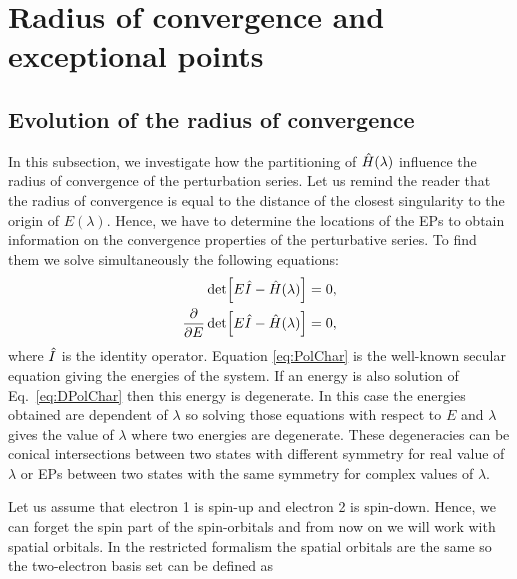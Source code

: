 \documentclass[11pt,a4paper]{article}
\newcommand{\hH}{\Hat{H}}
\newcommand{\hI}{\Hat{I}}
\begin{document}
\section{Radius of convergence and exceptional points}

\subsection{Evolution of the radius of convergence}

In this subsection, we investigate how the partitioning of $\hH(\lambda)$ influence the radius of convergence of the perturbation series. Let us remind the reader that the radius of convergence is equal to the distance of the closest singularity to the origin of $E(\lambda)$. Hence, we have to determine the locations of the EPs to obtain information on the convergence properties of the perturbative series. To find them we solve simultaneously the following equations:
\begin{subequations}
\begin{align}
	\label{eq:PolChar}
	\det[E\hI-\hH(\lambda)] & = 0,
	\\ 
	\label{eq:DPolChar}
	\pdv{E}\det[E\hI-\hH(\lambda)] & = 0,
\end{align}
\end{subequations}
where $\hI$ is the identity operator.
Equation \eqref{eq:PolChar} is the well-known secular equation giving the energies of the system. If an energy is also solution of Eq.~\eqref{eq:DPolChar} then this energy is degenerate. In this case the energies obtained are dependent of $\lambda$ so solving those equations with respect to $E$ and $\lambda$ gives the value of $\lambda$ where two energies are degenerate. These degeneracies can be conical intersections between two states with different symmetry for real value of $\lambda$ \cite{Yarkony_1996} or EPs between two states with the same symmetry for complex values of $\lambda$.

Let us assume that electron 1 is spin-up and electron 2 is spin-down. 
Hence, we can forget the spin part of the spin-orbitals and from now on we will work with spatial orbitals. In the restricted formalism the spatial orbitals are the same so the two-electron basis set can be defined as
\end{document}
